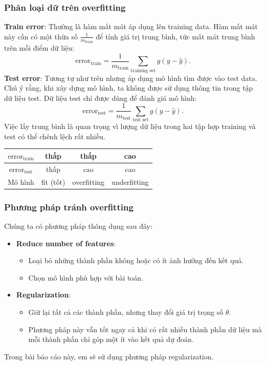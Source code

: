 \documentclass[]{article}
\begin{document}
\subsubsection{Phân loại dữ trên overfitting}
\textbf{Train error}: Thường là hàm mất mát áp dụng lên training data. Hàm mất mát này cần có một thừa số $\frac{1}{m_{\text{train}}}$ để tính giá trị trung bình, tức mất mát trung bình trên mỗi điểm dữ liệu:
$$\text{error}_{\text{train}}= \frac{1}{m_{\text{train}}} \sum_{\text{training set}} g(y-\hat{y}).$$
\textbf{Test error}: Tương tự như trên nhưng áp dụng mô hình tìm được vào test data. Chú ý rằng, khi xây dựng mô hình, ta không được sử dụng thông tin trong tập dữ liệu test. Dữ liệu test chỉ được dùng để đánh giá mô hình:
$$\text{error}_{\text{test}}= \frac{1}{m_{\text{test}}} \sum_{\text{test set}} g(y-\hat{y}).$$
Việc lấy trung bình là quan trọng vì lượng dữ liệu trong hai tập hợp training và test có thể chênh lệch rất nhiều.
\begin{center}
	\begin{tabular}{ |c|c|c|c| } 
		\hline
		$\text{error}_{\text{train}}$ & thấp & thấp & cao\\
		\hline 
		$\text{error}_{\text{test}}$ & thấp & cao&cao \\ 
		\hline
		Mô hình& fit (tốt) & overfitting &underfitting\\ 
		\hline
	\end{tabular}
\end{center}
\subsubsection{Phương pháp tránh overfitting}
Chúng ta có phương pháp thông dụng sau đây:
\begin{itemize}
	\item \textbf{Reduce number of features}:
	\begin{itemize}
		\item Loại bỏ những thành phần không hoặc có ít ảnh hưởng đến kết quả.
		\item Chọn mô hình phù hợp với bài toán.
	\end{itemize}
	\item \textbf{Regularization}:
	\begin{itemize}
		\item Giữ lại tất cả các thành phần, nhưng thay đổi giá trị trọng số $\theta$.
		\item Phương pháp này vẫn tốt ngay cả khi có rất nhiều thành phần dữ liệu mà mỗi thành phần chỉ góp một ít vào kết quả dự đoán.
	\end{itemize}
\end{itemize}
Trong bài báo cáo này, em sẽ sử dụng phương pháp regularization.
\end{document}
